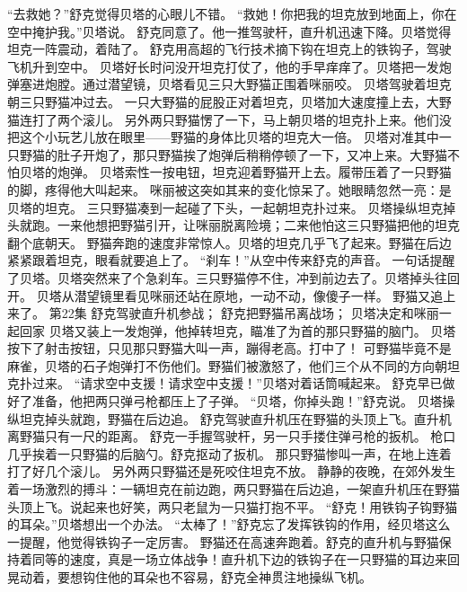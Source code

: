\documentclass[a4paper,12pt,UTF8,twoside]{ctexbook}
\begin{document}
        “去救她？”舒克觉得贝塔的心眼儿不错。 
        “救她！你把我的坦克放到地面上，你在空中掩护我。”贝塔说。 
        舒克同意了。他一推驾驶杆，直升机迅速下降。贝塔觉得坦克一阵震动，着陆了。 
        舒克用高超的飞行技术摘下钩在坦克上的铁钩子，驾驶飞机升到空中。 
        贝塔好长时问没开坦克打仗了，他的手早痒痒了。贝塔把一发炮弹塞进炮膛。通过潜望镜，贝塔看见三只大野猫正围着咪丽咬。 
        贝塔驾驶着坦克朝三只野猫冲过去。 
        一只大野猫的屁股正对着坦克，贝塔加大速度撞上去，大野猫连打了两个滚儿。 
        另外两只野猫愣了一下，马上朝贝塔的坦克扑上来。他们没把这个小玩艺儿放在眼里——野猫的身体比贝塔的坦克大一倍。 
        贝塔对准其中一只野猫的肚子开炮了，那只野猫挨了炮弹后稍稍停顿了一下，又冲上来。大野猫不怕贝塔的炮弹。 
        贝塔索性一按电钮，坦克迎着野猫开上去。履带压着了一只野猫的脚，疼得他大叫起来。 
        咪丽被这突如其来的变化惊呆了。她眼睛忽然一亮：是贝塔的坦克。 
        三只野猫凑到一起碰了下头，一起朝坦克扑过来。 
        贝塔操纵坦克掉头就跑。一来他想把野猫引开，让咪丽脱离险境；二来他怕这三只野猫把他的坦克翻个底朝天。 
        野猫奔跑的速度非常惊人。贝塔的坦克几乎飞了起来。野猫在后边紧紧跟着坦克，眼看就要追上了。 
        “刹车！”从空中传来舒克的声音。 
        一句话提醒了贝塔。贝塔突然来了个急刹车。三只野猫停不住，冲到前边去了。贝塔掉头往回开。 
        贝塔从潜望镜里看见咪丽还站在原地，一动不动，像傻子一样。 
        野猫又追上来了。   第22集 
        舒克驾驶直升机参战； 
        舒克把野猫吊离战场； 
        贝塔决定和咪丽一起回家   
        贝塔又装上一发炮弹，他掉转坦克，瞄准了为首的那只野猫的脑门。 
        贝塔按下了射击按钮，只见那只野猫大叫一声，蹦得老高。打中了！ 
        可野猫毕竟不是麻雀，贝塔的石子炮弹打不伤他们。野猫们被激怒了，他们三个从不同的方向朝坦克扑过来。 
        “请求空中支援！请求空中支援！”贝塔对着话筒喊起来。 
        舒克早已做好了准备，他把两只弹弓枪都压上了子弹。 
        “贝塔，你掉头跑！”舒克说。 
        贝塔操纵坦克掉头就跑，野猫在后边追。 
        舒克驾驶直升机压在野猫的头顶上飞。直升机离野猫只有一尺的距离。 
        舒克一手握驾驶杆，另一只手搂住弹弓枪的扳机。 
        枪口几乎挨着一只野猫的后脑勺。舒克抠动了扳机。 
        那只野猫惨叫一声，在地上连着打了好几个滚儿。 
        另外两只野猫还是死咬住坦克不放。 
        静静的夜晚，在郊外发生着一场激烈的搏斗：一辆坦克在前边跑，两只野猫在后边追，一架直升机压在野猫头顶上飞。说起来也好笑，两只老鼠为一只猫打抱不平。 
        “舒克！用铁钩子钩野猫的耳朵。”贝塔想出一个办法。 
        “太棒了！”舒克忘了发挥铁钩的作用，经贝塔这么一提醒，他觉得铁钩子一定厉害。 
        野猫还在高速奔跑着。舒克的直升机与野猫保持着同等的速度，真是一场立体战争！直升机下边的铁钩子在一只野猫的耳边来回晃动着，要想钩住他的耳朵也不容易，舒克全神贯注地操纵飞机。 
\end{document}
